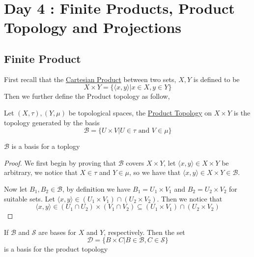 \section{Day 4 : Finite Products, Product Topology and Projections}
\subsection{Finite Product}
First recall that the \href{https://en.wikipedia.org/wiki/Cartesian_product}{Cartesian Product} between two sets, $X,Y$ is defined to be
\[X\times Y=\{\langle x,y\rangle\vert x\in X,y\in Y\}\]
Then we further define the Product topology as follow,
\begin{definition}
    Let $(X,\tau),(Y,\mu)$ be topological spaces, the \href{https://en.wikipedia.org/wiki/Product_topology}{Product Topology} on $X\times Y$ is the topology generated by the basis
    \[\mathscr{B}=\{U\times V\vert U\in\tau\text{ and } V\in\mu\}\]    
\end{definition}
\begin{proposition}
    $\mathscr{B}$ is a basis for a toplogy
\end{proposition}
\begin{proof}
    We first begin by proving that $\mathscr{B}$ covers $X\times Y$, let $\langle x,y\rangle\in X\times Y$ be arbitrary, we notice that $X\in\tau$ and $Y\in\mu$, so we have that $\langle x,y\rangle\in X\times Y\in\mathscr{B}$.

    Now let $B_1,B_2\in\mathscr{B}$, by definition we have $B_1=U_1\times V_1$ and $B_2 = U_2\times V_2$ for suitable sets. Let $\langle x,y\rangle\in(U_1\times V_1)\cap(U_2\times V_2)$. Then we notice that 
    \[\langle x,y\rangle\in(U_1\cap U_2)\times(V_1\cap V_2)\subseteq (U_1\times V_1)\cap(U_2\times V_2)\]
\end{proof}
\begin{theorem}
    If $\mathscr{B}$ and $\mathscr{S}$ are bases for $X$ and $Y$, respectively. Then the set 
    \[\mathscr{D} = \{B\times C\vert B\in\mathscr{B},C\in\mathscr{S}\}\]
    is a basis for the product topology
\end{theorem}
